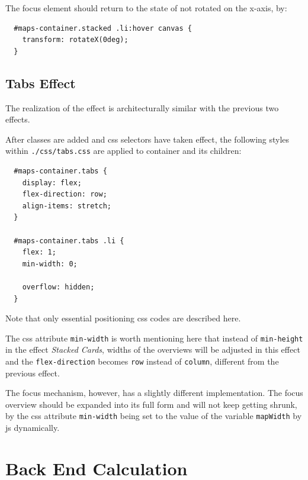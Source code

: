 The focus element should return to the state of not rotated on the x-axis, by:

\begin{verbatim}
  #maps-container.stacked .li:hover canvas {
    transform: rotateX(0deg);
  }
\end{verbatim}

\subsection{Tabs Effect}
\label{chap4:tabs}

The realization of the effect is architecturally similar with the previous two effects.

After classes are added and \gls{css} selectors have taken effect, the following styles within \texttt{./css/tabs.css} are applied to container and its children:

\begin{verbatim}
  #maps-container.tabs {
    display: flex;
    flex-direction: row;
    align-items: stretch;
  }

  #maps-container.tabs .li {
    flex: 1;
    min-width: 0;

    overflow: hidden;
  }
\end{verbatim}

Note that only essential positioning \gls{css} codes are described here.

The \gls{css} attribute \texttt{min-width} is worth mentioning here that instead of \texttt{min-height} in the effect \emph{Stacked Cards}, widths of the overviews will be adjusted in this effect and the \texttt{flex-direction} becomes \texttt{row} instead of \texttt{column}, different from the previous effect.

The focus mechanism, however, has a slightly different implementation. The focus overview should be expanded into its full form and will not keep getting shrunk, by the \gls{css} attribute \texttt{min-width} being set to the value of the variable \texttt{mapWidth} by \gls{js} dynamically.


\section{Back End Calculation}


